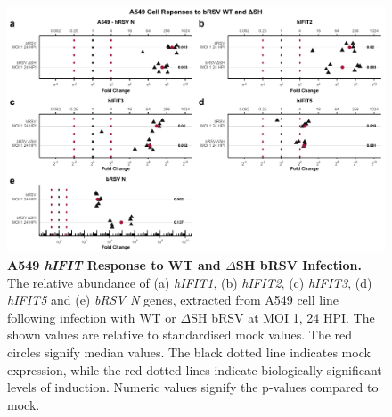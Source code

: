 \begin{figure}
    \centering
    \includegraphics[width=1\linewidth]{06. Chapter 1/Figs/01. Induction/07. a549_brsv_moi1.pdf}
    \caption[A549 \textit{hIFIT} Response to WT and \(\Delta\)SH bRSV Infection.]{\textbf{A549 \textit{hIFIT} Response to WT and \(\Delta\)SH bRSV Infection.} The relative abundance of (a) \textit{hIFIT1}, (b) \textit{hIFIT2}, (c) \textit{hIFIT3}, (d) \textit{hIFIT5} and (e) \textit{bRSV N} genes, extracted from A549 cell line following infection with WT or \(\Delta\)SH bRSV at MOI 1, 24 HPI.  The shown values are relative to standardised mock values. The red circles signify median values. The black dotted line indicates mock expression, while the red dotted lines indicate biologically significant levels of induction. Numeric values signify the p-values compared to mock.}
    \label{Responses of A549 to bRSV WT and dSH.}
\end{figure}

